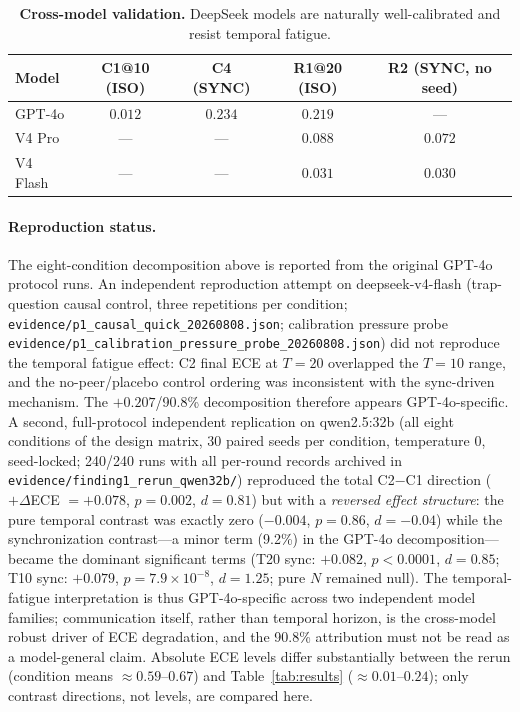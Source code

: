 \documentclass[11pt]{article}
\theoremstyle{definition}
\theoremstyle{remark}
\begin{document}
\begin{table}[H]
\centering
\caption{\textbf{Cross-model validation.} DeepSeek models are naturally well-calibrated and resist temporal fatigue.}
\label{tab:cross}
\begin{tabular}{@{}lcccc@{}}
\toprule
Model & C1@10 (ISO) & C4 (SYNC) & R1@20 (ISO) & R2 (SYNC, no seed) \\
\midrule
GPT-4o & $0.012$ & $0.234$ & $0.219$ & --- \\
V4 Pro & --- & --- & $0.088$ & $0.072$ \\
V4 Flash & --- & --- & $0.031$ & $0.030$ \\
\bottomrule
\end{tabular}
\end{table}

\paragraph{Reproduction status.} The eight-condition decomposition above is reported from the original GPT-4o protocol runs. An independent reproduction attempt on deepseek-v4-flash (trap-question causal control, three repetitions per condition; \texttt{evidence/p1\_causal\_quick\_20260808.json}; calibration pressure probe \texttt{evidence/p1\_calibration\_pressure\_probe\_20260808.json}) did not reproduce the temporal fatigue effect: C2 final ECE at $T{=}20$ overlapped the $T{=}10$ range, and the no-peer/placebo control ordering was inconsistent with the sync-driven mechanism. The $+0.207$/90.8\% decomposition therefore appears GPT-4o-specific. A second, full-protocol independent replication on qwen2.5:32b (all eight conditions of the design matrix, 30 paired seeds per condition, temperature 0, seed-locked; 240/240 runs with all per-round records archived in \texttt{evidence/finding1\_rerun\_qwen32b/}) reproduced the total C2$-$C1 direction ($+\Delta$ECE $= +0.078$, $p = 0.002$, $d = 0.81$) but with a \emph{reversed effect structure}: the pure temporal contrast was exactly zero ($-0.004$, $p = 0.86$, $d = -0.04$) while the synchronization contrast---a minor term (9.2\%) in the GPT-4o decomposition---became the dominant significant terms (T20 sync: $+0.082$, $p < 0.0001$, $d = 0.85$; T10 sync: $+0.079$, $p = 7.9{\times}10^{-8}$, $d = 1.25$; pure $N$ remained null). The temporal-fatigue interpretation is thus GPT-4o-specific across two independent model families; communication itself, rather than temporal horizon, is the cross-model robust driver of ECE degradation, and the 90.8\% attribution must not be read as a model-general claim. Absolute ECE levels differ substantially between the rerun (condition means $\approx 0.59$--$0.67$) and Table~\ref{tab:results} ($\approx 0.01$--$0.24$); only contrast directions, not levels, are compared here.
\end{document}
